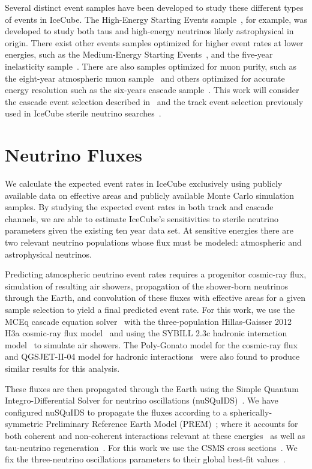 \documentclass[main.tex]{subfiles}
\begin{document}
Several distinct event samples have been developed to study these different types of events in IceCube. The High-Energy Starting Events sample~\cite{2021hese}, for example, was developed to study both taus and high-energy neutrinos likely astrophysical in origin. There exist other events samples optimized for higher event rates at lower energies, such as the Medium-Energy Starting Events~\cite{PhysRevDoverone}, and the five-year inelasticity sample~\cite{inelasticity2019}. There are also samples optimized for muon purity, such as the eight-year atmospheric muon sample~\cite{Aartsen_2020_prd} and others optimized for accurate energy resolution such as the six-years cascade sample~\cite{sixyrscascade}. This work will consider the cascade event selection described in~\cite{2018PhDT17N} and the track event selection previously used in IceCube sterile neutrino searches~\cite{PhysRevLett.117.071801}.

\section{\label{sec:flux} Neutrino Fluxes}

We calculate the expected event rates in IceCube exclusively using publicly available data on effective areas and publicly available Monte Carlo simulation samples. By studying the expected event rates in both track and cascade channels, we are able to estimate IceCube's sensitivities to sterile neutrino parameters given the existing ten year data set. 
At sensitive energies there are two relevant neutrino populations whose flux must be modeled: atmospheric and astrophysical neutrinos. 

Predicting atmospheric neutrino event rates requires a progenitor cosmic-ray flux, simulation of resulting air showers, propagation of the shower-born neutrinos through the Earth, and convolution of these fluxes with effective areas for a given sample selection to yield a final predicted event rate. 
For this work, we use the MCEq cascade equation solver~\cite{fedynitch2015calculation} with the three-population Hillas-Gaisser 2012 H3a cosmic-ray flux model~\cite{GAISSER2012801} and using the SYBILL 2.3c hadronic interaction model~\cite{Riehn:2017mfm} to simulate air showers.
The Poly-Gonato model for the cosmic-ray flux~\cite{polygonato2003} and QGSJET-II-04 model for hadronic interactions~\cite{qgsjet2011} were also found to produce similar results for this analysis. 

These fluxes are then propagated through the Earth using the Simple Quantum Integro-Differential Solver for neutrino oscillations (nuSQuIDS)~\cite{Delgado:2014kpa,arguelles:2015nu,arguelles2021nusquids}. 
We have configured nuSQuIDS to propagate the fluxes according to a spherically-symmetric Preliminary Reference Earth Model (PREM)~\cite{DZIEWONSKI1981297}; where it accounts for both coherent and non-coherent interactions relevant at these energies~\cite{Gonzalez_Garcia_2005, PhysRev.118.316} as well as tau-neutrino regeneration~\cite{PhysRevLett.81.4305}. 
For this work we use the CSMS cross sections~\cite{CooperSarkar:2011pa}. We fix the three-neutrino oscillations parameters to their global best-fit values~\cite{nufit2020}.
\end{document}
